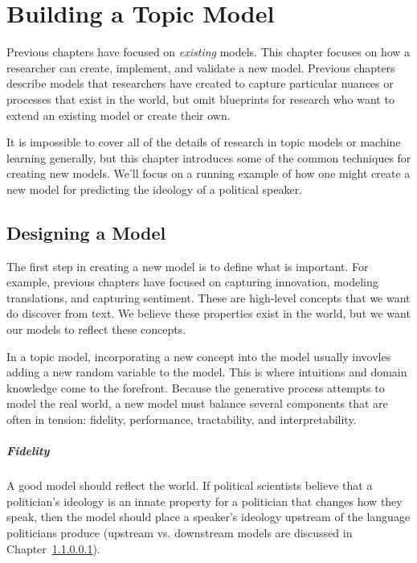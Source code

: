 \chapter{Building a Topic Model}
\label{ch:building}

Previous chapters have focused on \emph{existing} models.  This
chapter focuses on how a researcher can create, implement, and
validate a new model.  Previous chapters describe
models that researchers have created to capture particular nuances or
processes that exist in the world, but omit blueprints
for research who want to extend an existing model or create their own.

It is impossible to cover all of the details of research in topic
models or machine learning generally, but this chapter introduces some
of the common techniques for creating new models.  We'll focus on a
running example of how one might create a new model for predicting the
ideology of a political speaker.

\section{Designing a Model}

The first step in creating a new model is to define what is
important.  For example, previous chapters have focused on capturing
innovation, modeling translations, and capturing sentiment.  These are
high-level concepts that we want do discover from text.  We believe
these properties exist in the world, but we want our models to reflect
these concepts.

In a topic model, incorporating a new concept into the model usually
invovles adding a new random variable to the model.  This is where
intuitions and domain knowledge come to the forefront.  Because the
generative process attempts to model the real world, a new model must
balance several components that are often in tension: fidelity,
performance, tractability, and interpretability.

\paragraph{Fidelity}

A good model should reflect the world.  If political scientists
believe that a politician's ideology is an innate property for a
politician that changes how they speak, then the model should place a
speaker's ideology upstream of the language politicians produce
(upstream vs. downstream models are discussed in Chapter~\ref{}).

